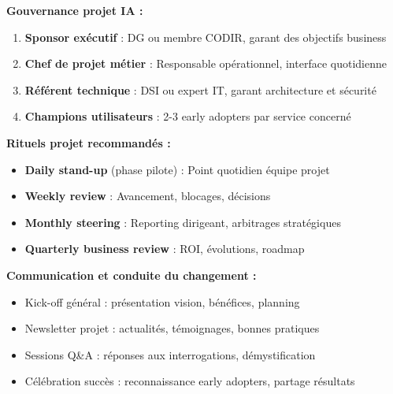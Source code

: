 \textbf{Gouvernance projet IA :}
\begin{enumerate}
    \item \textbf{Sponsor exécutif} : DG ou membre CODIR, garant des objectifs business
    \item \textbf{Chef de projet métier} : Responsable opérationnel, interface quotidienne
    \item \textbf{Référent technique} : DSI ou expert IT, garant architecture et sécurité
    \item \textbf{Champions utilisateurs} : 2-3 early adopters par service concerné
\end{enumerate}

\textbf{Rituels projet recommandés :}
\begin{itemize}
    \item \textbf{Daily stand-up} (phase pilote) : Point quotidien équipe projet
    \item \textbf{Weekly review} : Avancement, blocages, décisions
    \item \textbf{Monthly steering} : Reporting dirigeant, arbitrages stratégiques
    \item \textbf{Quarterly business review} : ROI, évolutions, roadmap
\end{itemize}

\textbf{Communication et conduite du changement :}
\begin{itemize}
    \item Kick-off général : présentation vision, bénéfices, planning
    \item Newsletter projet : actualités, témoignages, bonnes pratiques
    \item Sessions Q\&A : réponses aux interrogations, démystification
    \item Célébration succès : reconnaissance early adopters, partage résultats
\end{itemize}
